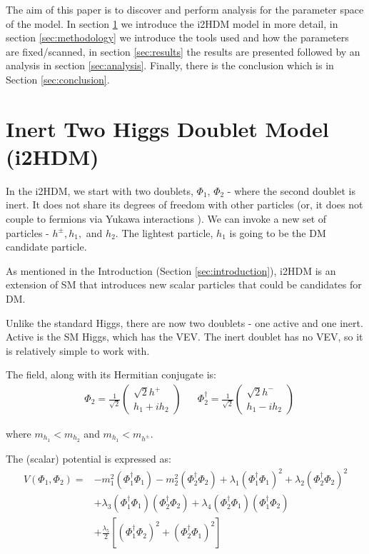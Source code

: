 \documentclass[12pt]{article}
\begin{document}
The aim of this paper is to discover and perform analysis for the parameter space of the model. In section \ref{sec:i2HDM} we introduce the i2HDM model in more detail, in section \ref{sec:methodology} we introduce the tools used and how the parameters are fixed/scanned, in section \ref{sec:results} the results are presented followed by an analysis in section \ref{sec:analysis}. Finally, there is the conclusion which is in Section \ref{sec:conclusion}.

\section{Inert Two Higgs Doublet Model (i2HDM)}
\label{sec:i2HDM}
In the i2HDM, we start with two doublets, $\Phi_1$, $\Phi_2$ - where the second doublet is inert. It does not share its degrees of freedom with other particles (or, it does not couple to fermions via Yukawa interactions \cite{Belyaev_2022}). We can invoke a new set of particles - $h^\pm, h_1,$ and $h_2$. The lightest particle, $h_1$ is going to be the DM candidate particle.

As mentioned in the Introduction (Section \ref{sec:introduction}), i2HDM is an extension of SM that introduces new scalar particles that could be candidates for DM.

Unlike the standard Higgs, there are now two doublets - one active and one inert. Active is the SM Higgs, which has the VEV. The inert doublet has no VEV, so it is relatively simple to work with.

 The field, along with its Hermitian conjugate is:
\begin{align}
    &\Phi_2 = \frac{1}{\sqrt{2}}
        \begin{pmatrix}
            {\sqrt{2}h^+} \\
            {h_1 + ih_2 }
        \end{pmatrix}&
    &\Phi_2^\dagger = \frac{1}{\sqrt{2}} 
        \begin{pmatrix}
            {\sqrt{2}h^-} \\
            {h_1 - ih_2 }
        \end{pmatrix}
\end{align}

where $m_{h_1} < m_{h_2}$ and $m_{h_1} < m_{h^\pm}$. 

The (scalar) potential is expressed as:
\begin{equation}
    \begin{split}
        V(\Phi_1, \Phi_2) =& -m_1^2(\Phi_1^\dagger\Phi_1) - m_2^2(\Phi_2^\dagger\Phi_2) +
        \lambda_1(\Phi_1^\dagger\Phi_1)^2 + \lambda_2(\Phi_2^\dagger\Phi_2)^2 \\ 
        &+ \lambda_3(\Phi_1^\dagger\Phi_1)(\Phi_2^\dagger\Phi_2) + \lambda_4(\Phi_2^\dagger\Phi_1)(\Phi_1^\dagger\Phi_2)\\ 
        &+ \frac{\lambda_5}{2}[(\Phi_1^\dagger\Phi_2)^2 + (\Phi_2^\dagger\Phi_1)^2]
        \end{split}
        \label{eq:higgs_potential}
\end{equation}
\end{document}
